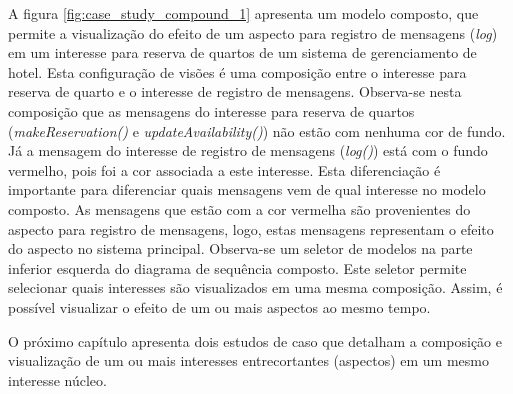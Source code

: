 A figura \ref{fig:case_study_compound_1} apresenta um modelo composto, que permite a visualização do efeito de um aspecto para registro de mensagens
(\textit{log}) em um interesse para reserva de quartos de um sistema de gerenciamento de hotel. Esta configuração de visões é uma composição
entre o interesse para reserva de quarto e o interesse de registro de mensagens. Observa-se nesta composição que as mensagens do interesse para reserva de 
quartos (\textit{makeReservation()} e \textit{updateAvailability()}) não estão com nenhuma cor de fundo. Já a mensagem do interesse de registro de
mensagens (\textit{log()}) está com o fundo vermelho, pois foi a cor associada a este interesse. Esta diferenciação é importante para diferenciar quais mensagens 
vem de qual interesse no modelo composto. As mensagens que estão com a cor vermelha são provenientes do aspecto para registro de mensagens, logo,
estas mensagens representam o efeito do aspecto no sistema principal. Observa-se um seletor de modelos na parte inferior esquerda do diagrama de
sequência composto. Este seletor permite selecionar quais interesses são visualizados em uma mesma composição. Assim, é possível visualizar o efeito
de um ou mais aspectos ao mesmo tempo. 

O próximo capítulo apresenta dois estudos de caso que detalham a composição e visualização de um ou mais interesses entrecortantes (aspectos) em um
mesmo interesse núcleo.

